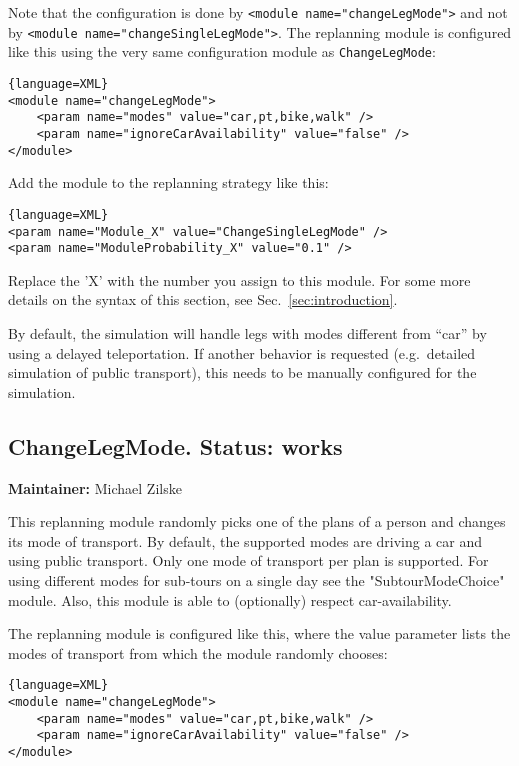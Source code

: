 Note that the configuration is done by \verb$<module name="changeLegMode">$ and not by \verb$<module name="changeSingleLegMode">$. The replanning module is configured like  this using the very same configuration module as \verb$ChangeLegMode$:
\begin{lstlisting}{language=XML}
<module name="changeLegMode">
    <param name="modes" value="car,pt,bike,walk" />
    <param name="ignoreCarAvailability" value="false" />
</module>
\end{lstlisting}

Add the module to the replanning strategy like this:
\begin{lstlisting}{language=XML}
<param name="Module_X" value="ChangeSingleLegMode" />
<param name="ModuleProbability_X" value="0.1" />
\end{lstlisting}

Replace the 'X' with the number you assign to this module. For some more details on the syntax of this section, see Sec.~\ref{sec:introduction}.

By default, the simulation will handle legs with modes different from  ``car'' by using a delayed teleportation. If another behavior is  requested (e.g.\ detailed simulation of public transport), this needs to  be manually configured for the simulation.


\subsection{ChangeLegMode. Status: works}
\label{sec:changeLegMode}

\textbf{Maintainer:} Michael Zilske

This replanning module randomly picks one of the plans of a person  and changes its mode of transport. By default, the supported modes  are driving a car and using public transport. Only one mode of transport  per plan is supported. For using different modes for sub-tours on a  single day see the "SubtourModeChoice" module. Also, this module is able  to (optionally) respect car-availability.

The replanning module is configured like this, where the value  parameter lists the modes of transport from which the module randomly  chooses:
\begin{lstlisting}{language=XML}
<module name="changeLegMode">
    <param name="modes" value="car,pt,bike,walk" />
    <param name="ignoreCarAvailability" value="false" />
</module>
\end{lstlisting}

